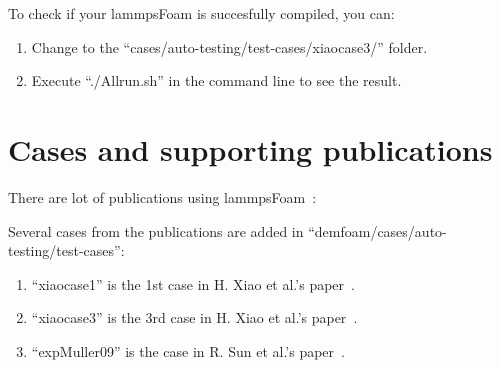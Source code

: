 \documentclass[11pt]{article}
\begin{document}
To check if your lammpsFoam is succesfully compiled, you can:
\begin{enumerate}
    \item Change to the ``cases/auto-testing/test-cases/xiaocase3/'' folder. 
    \item Execute ``./Allrun.sh'' in the command line to see the result.
\end{enumerate}

\section{Cases and supporting publications}

There are lot of publications using
lammpsFoam~\cite{sun09,xiao-cicp,gupta11a,gupta11b,gupta11b,gxs11a,gupta13a,gupta12,part1,part2}:

Several cases from the publications are added in ``demfoam/cases/auto-testing/test-cases'':
\begin{enumerate}
    \item ``xiaocase1'' is the 1st case in H. Xiao et al.'s paper~\cite{xiao-cicp}.
    \item ``xiaocase3'' is the 3rd case in H. Xiao et al.'s paper~\cite{xiao-cicp}.
    \item ``expMuller09'' is the case in R. Sun et al.'s paper~\cite{part1,part2}.
\end{enumerate}



\end{document}
